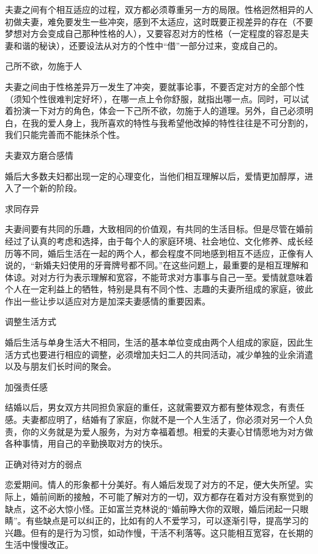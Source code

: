 \documentclass[12pt,UTF8,openany]{ctexbook}
\begin{document}
夫妻之间有个相互适应的过程，双方都必须尊重另一方的局限。性格迥然相异的人初做夫妻，难免要发生一些冲突，感到不太适应，这时既要正视差异的存在（不要梦想对方会变成自己那种性格的人），又要容忍对方的性格（一定程度的容忍是夫妻和谐的秘诀），还要设法从对方的个性中“借”一部分过来，变成自己的。





己所不欲，勿施于人


夫妻之间由于性格差异万一发生了冲突，要就事论事，不要否定对方的全部个性（须知个性很难判定好坏），在哪一点上令你舒服，就指出哪一点。同时，可以试着扮演一下对方的角色，体会一下己所不欲，勿施于人的道理。另外，自己必须明白，在我的爱人身上，我所喜欢的特性与我希望他改掉的特性往往是不可分割的，我们只能完善而不能抹杀个性。





夫妻双方磨合感情


婚后大多数夫妇都出现一定的心理变化，当他们相互理解以后，爱情更加醇厚，进入了一个新的阶段。

求同存异

夫妻间要有共同的乐趣，大致相同的价值观，有共同的生活目标。但是尽管在婚前经过了认真的考虑和选择，由于每个人的家庭环境、社会地位、文化修养、成长经历等不同，婚后生活在一起的两个人，都会程度不同地感到相互不适应，正像有人说的，“新婚夫妇使用的牙膏牌号都不同。”在这些问题上，最重要的是相互理解和体谅。对对方行为表示理解和宽容，不能苛求对方事事与自己一至。爱情就意味着个人在一定利益上的牺牲，特别是具有不同个性、志趣的夫妻所组成的家庭，彼此作出一些让步以适应对方是加深夫妻感情的重要因素。

调整生活方式

婚后生活与单身生活大不相同，生活的基本单位变成由两个人组成的家庭，因此生活方式也要进行相应的调整，必须增加夫妇二人的共同活动，减少单独的业余消遣以及与朋友们长时间的聚会。

加强责任感

结婚以后，男女双方共同担负家庭的重任，这就需要双方都有整体观念，有责任感。夫妻都应明了，结婚有了家庭，你就不是一个人生活了，你必须对另一个人负责，你的义务就是为爱人服务，为对方幸福着想。相爱的夫妻心甘情愿地为对方做各种事情，用自己的辛勤换取对方的快乐。

正确对待对方的弱点

恋爱期间。情人的形象都十分美好。有人婚后发现了对方的不足，便大失所望。实际上，婚前间断的接触，不可能了解对方的一切，双方都存在着对方没有察觉到的缺点，这不必大惊小怪。正如富兰克林说的“婚前睁大你的双眼，婚后闭起一只眼睛”。有些缺点是可以纠正的，比如有的人不爱学习，可以逐渐引导，提高学习的兴趣。但有的是行为习惯，如动作慢，干活不利落等。这只能相互宽容，在长期的生活中慢慢改正。
\end{document}
